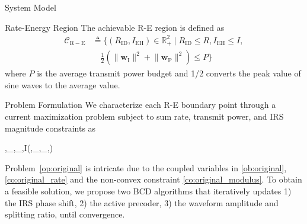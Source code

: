 \documentclass[journal]{IEEEtran}
\begin{document}
\begin{section}{System Model}
		\begin{subsection}{Rate-Energy Region}
			The achievable R-E region is defined as
			\begin{align}
				\mathcal{C}_{\mathrm{R-E}}
				&\triangleq \biggl\{(R_{\mathrm{ID}}, I_{\mathrm{EH}}) \in \mathbb{R}_+^2 \mid R_{\mathrm{ID}} \le R, I_{\mathrm{EH}} \le I,\nonumber\\
				&\quad \frac{1}{2}\left(\lVert{\boldsymbol{w}_{\mathrm{I}}}\rVert^2+\lVert{\boldsymbol{w}_{\mathrm{P}}}\rVert^2\right) \le P\biggr\}
			\end{align}
			where $P$ is the average transmit power budget and \num{1/2} converts the peak value of sine waves to the average value.
		\end{subsection}
	\end{section}


	\begin{section}{Problem Formulation}\label{se:problem_formulation}
		We characterize each R-E boundary point through a current maximization problem subject to sum rate, transmit power, and IRS magnitude constraints as
		\begin{maxi!}
			{\boldsymbol{\phi},_{},_{},\rho}{I(\boldsymbol{\phi},_{},_{},\rho)}{\label{op:original}}{\label{ob:original}}
			\label{co:original_rate}
			\label{co:original_power}
			\label{co:original_modulus}
		\end{maxi!}

		Problem~\eqref{op:original} is intricate due to the coupled variables in \eqref{ob:original}, \eqref{co:original_rate} and the non-convex constraint \eqref{co:original_modulus}. To obtain a feasible solution, we propose two BCD algorithms that iteratively updates 1) the IRS phase shift, 2) the active precoder, 3) the waveform amplitude and splitting ratio, until convergence.



\end{section}
\end{document}
